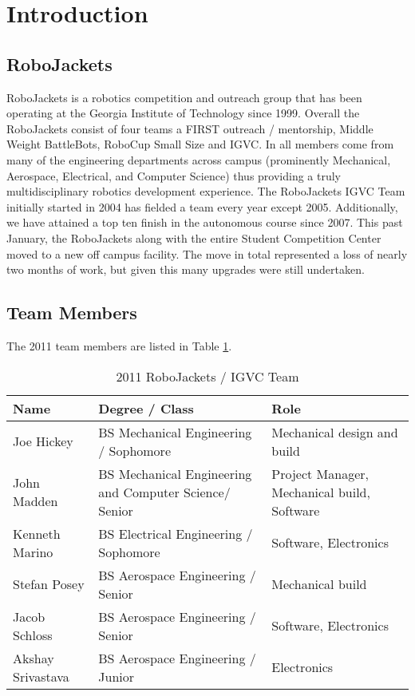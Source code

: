 \section{Introduction}

\subsection{RoboJackets}

RoboJackets is a robotics competition and outreach group that has been operating at the Georgia Institute of Technology since 1999. Overall the RoboJackets consist of four teams a FIRST outreach / mentorship, Middle Weight BattleBots, RoboCup Small Size and IGVC. In all members come from many of the engineering departments across campus (prominently Mechanical, Aerospace, Electrical, and Computer Science) thus providing a truly multidisciplinary robotics development experience. The RoboJackets IGVC Team initially started in 2004 has fielded a team every year except 2005. Additionally, we have attained a top ten finish in the autonomous course since 2007. This past January, the RoboJackets along with the entire Student Competition Center moved to a new off campus facility. The move in total represented a loss of nearly two months of work, but given this many upgrades were still undertaken. 

\subsection{Team Members}

The 2011 team members are listed in Table \ref{TAB:RJTeam}.

\begin{table}[H]
\begin{center}
\caption{2011 RoboJackets / IGVC Team}
\begin{tabular}{| l | p{2.4in} | p{2in} |}
\hline
Name & Degree / Class & Role\\ \hline
Joe Hickey &		BS Mechanical Engineering / Sophomore&	Mechanical design and build\\ \hline
John Madden &		BS Mechanical Engineering and Computer Science/ Senior & Project Manager, Mechanical build, Software\\ \hline
Kenneth Marino &	BS Electrical Engineering / Sophomore&	Software, Electronics\\ \hline
Stefan Posey &		BS Aerospace Engineering / Senior &		Mechanical build\\ \hline
Jacob Schloss &		BS Aerospace Engineering / Senior&	Software, Electronics\\ \hline
Akshay Srivastava &	BS Aerospace Engineering / Junior&	Electronics\\ \hline

\end{tabular}
\label{TAB:RJTeam}
\end{center}
\end{table}
